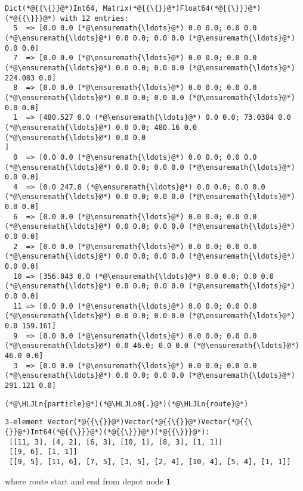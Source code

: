 \documentclass[12pt,a4paper]{article}
\newcommand{\HLJLn}[1]{#1}
\newcommand{\HLJLoB}[1]{\textcolor[RGB]{102,102,102}{\textbf{#1}}}
\begin{document}
\begin{lstlisting}
Dict(*@{{\{}}@*)Int64, Matrix(*@{{\{}}@*)Float64(*@{{\}}}@*)(*@{{\}}}@*) with 12 entries:
  5  => [0.0 0.0 (*@\ensuremath{\ldots}@*) 0.0 0.0; 0.0 0.0 (*@\ensuremath{\ldots}@*) 0.0 0.0; 0.0 0.0 (*@\ensuremath{\ldots}@*) 0.0 0.0]
  7  => [0.0 0.0 (*@\ensuremath{\ldots}@*) 0.0 0.0; 0.0 0.0 (*@\ensuremath{\ldots}@*) 0.0 0.0; 0.0 0.0 (*@\ensuremath{\ldots}@*) 224.083 0.0]
  8  => [0.0 0.0 (*@\ensuremath{\ldots}@*) 0.0 0.0; 0.0 0.0 (*@\ensuremath{\ldots}@*) 0.0 0.0; 0.0 0.0 (*@\ensuremath{\ldots}@*) 0.0 0.0]
  1  => [480.527 0.0 (*@\ensuremath{\ldots}@*) 0.0 0.0; 73.0384 0.0 (*@\ensuremath{\ldots}@*) 0.0 0.0; 480.16 0.0 (*@\ensuremath{\ldots}@*) 0.0 0.0
]
  0  => [0.0 0.0 (*@\ensuremath{\ldots}@*) 0.0 0.0; 0.0 0.0 (*@\ensuremath{\ldots}@*) 0.0 0.0; 0.0 0.0 (*@\ensuremath{\ldots}@*) 0.0 0.0]
  4  => [0.0 247.0 (*@\ensuremath{\ldots}@*) 0.0 0.0; 0.0 0.0 (*@\ensuremath{\ldots}@*) 0.0 0.0; 0.0 0.0 (*@\ensuremath{\ldots}@*) 0.0 0.0]
  6  => [0.0 0.0 (*@\ensuremath{\ldots}@*) 0.0 0.0; 0.0 0.0 (*@\ensuremath{\ldots}@*) 0.0 0.0; 0.0 0.0 (*@\ensuremath{\ldots}@*) 0.0 0.0]
  2  => [0.0 0.0 (*@\ensuremath{\ldots}@*) 0.0 0.0; 0.0 0.0 (*@\ensuremath{\ldots}@*) 0.0 0.0; 0.0 0.0 (*@\ensuremath{\ldots}@*) 0.0 0.0]
  10 => [356.043 0.0 (*@\ensuremath{\ldots}@*) 0.0 0.0; 0.0 0.0 (*@\ensuremath{\ldots}@*) 0.0 0.0; 0.0 0.0 (*@\ensuremath{\ldots}@*) 0.0 0.0]
  11 => [0.0 0.0 (*@\ensuremath{\ldots}@*) 0.0 0.0; 0.0 0.0 (*@\ensuremath{\ldots}@*) 0.0 0.0; 0.0 0.0 (*@\ensuremath{\ldots}@*) 0.0 159.161]
  9  => [0.0 0.0 (*@\ensuremath{\ldots}@*) 0.0 0.0; 0.0 0.0 (*@\ensuremath{\ldots}@*) 0.0 46.0; 0.0 0.0 (*@\ensuremath{\ldots}@*) 46.0 0.0]
  3  => [0.0 0.0 (*@\ensuremath{\ldots}@*) 0.0 0.0; 0.0 0.0 (*@\ensuremath{\ldots}@*) 0.0 0.0; 0.0 0.0 (*@\ensuremath{\ldots}@*) 291.121 0.0]
\end{lstlisting}


\begin{lstlisting}
(*@\HLJLn{particle}@*)(*@\HLJLoB{.}@*)(*@\HLJLn{route}@*)
\end{lstlisting}

\begin{lstlisting}
3-element Vector(*@{{\{}}@*)Vector(*@{{\{}}@*)Vector(*@{{\{}}@*)Int64(*@{{\}}}@*)(*@{{\}}}@*)(*@{{\}}}@*):
 [[11, 3], [4, 2], [6, 3], [10, 1], [8, 3], [1, 1]]
 [[9, 6], [1, 1]]
 [[9, 5], [11, 6], [7, 5], [3, 5], [2, 4], [10, 4], [5, 4], [1, 1]]
\end{lstlisting}


where route start and end from depot node \texttt{1}
\end{document}
